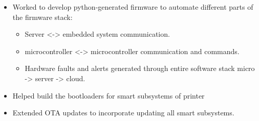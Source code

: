 \documentclass[10pt,a4paper,ragged2e,withhyper]{altacv}
\begin{document}
\begin{itemize}
\item Worked to develop python-generated firmware to automate different parts of the firmware stack:
	\begin{itemize}
	\item Server <-> embedded system communication.
	\item microcontroller <-> microcontroller communication and commands.
	\item Hardware faults and alerts generated through entire software stack micro -> server -> cloud.
	\end{itemize}
\end{itemize}

\divider

\begin{itemize}
\item Helped build the bootloaders for smart subsystems of printer
\item Extended OTA updates to incorporate updating all smart subsystems.
\end{itemize}

\divider
\end{document}
